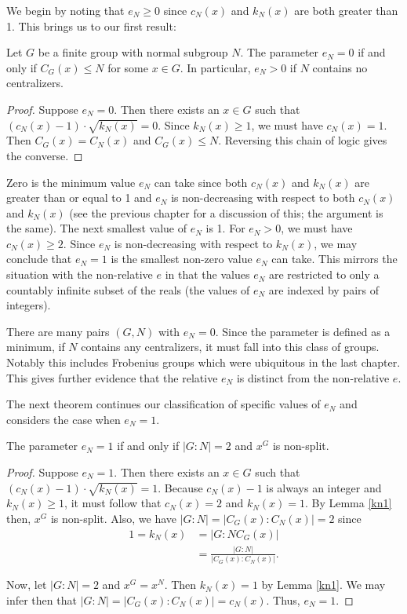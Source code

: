 \documentclass[main.tex]{subfiles}
\begin{document}
We begin by noting that $e_N \ge 0$ since $c_N(x)$ and $k_N(x)$ are both greater than 1. This brings us to our first result:

\begin{theorem}\label{en0}
Let $G$ be a finite group with normal subgroup $N$. The parameter $e_N = 0$ if and only if $C_G(x) \le N$ for some $x \in G$. In particular, $e_N > 0$ if $N$ contains no centralizers.
\end{theorem}

\begin{proof}
Suppose $e_N = 0$. Then there exists an $x \in G$ such that $(c_N(x) - 1) \cdot \sqrt{k_N(x)} = 0$. Since $k_N(x) \ge 1$, we must have $c_N(x) = 1$. Then $C_G(x) = C_N(x)$ and $C_G(x) \le N$. Reversing this chain of logic gives the converse.
\end{proof}

Zero is the minimum value $e_N$ can take since both $c_N(x)$ and $k_N(x)$ are greater than or equal to 1 and $e_N$ is non-decreasing with respect to both $c_N(x)$ and $k_N(x)$ (see the previous chapter for a discussion of this; the argument is the same). The next smallest value of $e_N$ is 1. For $e_N > 0$, we must have $c_N(x) \ge 2$. Since $e_N$ is non-decreasing with respect to $k_N(x)$, we may conclude that $e_N = 1$ is the smallest non-zero value $e_N$ can take. This mirrors the situation with the non-relative $e$ in that the values $e_N$ are restricted to only a countably infinite subset of the reals (the values of $e_N$ are indexed by pairs of integers).

There are many pairs $(G, N)$ with $e_N = 0$. Since the parameter is defined as a minimum, if $N$ contains any centralizers, it must fall into this class of groups. Notably this includes Frobenius groups which were ubiquitous in the last chapter. This gives further evidence that the relative $e_N$ is distinct from the non-relative $e$.

The next theorem continues our classification of specific values of $e_N$ and considers the case when $e_N = 1$.

\begin{theorem}\label{en1}
The parameter $e_N =1$ if and only if $|G:N| = 2$ and $x^G$ is non-split.
\end{theorem}

\begin{proof}
Suppose $e_N = 1$. Then there exists an $x \in G$ such that $(c_N(x) - 1) \cdot \sqrt{k_N(x)} = 1$. Because $c_N(x) - 1$ is always an integer and $k_N(x) \ge 1$, it must follow that $c_N(x) = 2$ and $k_N(x) = 1$. By Lemma \ref{kn1} then, $x^G$ is non-split. Also, we have $|G : N| = |C_G(x) : C_N(x)| = 2$ since
\begin{align*}
1 = k_N(x) &= |G : NC_G(x)| \\
&= \frac{|G : N|}{|C_G(x) : C_N(x)|} \text{.}
\end{align*}

Now, let $|G:N| = 2$ and $x^G = x^N$. Then $k_N(x) = 1$ by Lemma \ref{kn1}. We may infer then that $|G : N| = |C_G(x) : C_N(x)| = c_N(x)$. Thus, $e_N = 1$. 
\end{proof}
\end{document}
